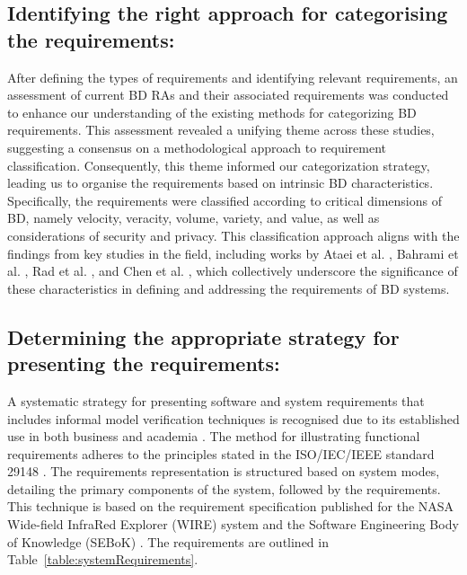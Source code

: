 \documentclass[preprint,12pt]{elsarticle}
\begin{document}
\subsection{Identifying the right approach for categorising the requirements:}

After defining the types of requirements and identifying relevant requirements, an assessment of current BD RAs and their associated requirements was conducted to enhance our understanding of the existing methods for categorizing BD requirements. This assessment revealed a unifying theme across these studies, suggesting a consensus on a methodological approach to requirement classification. Consequently, this theme informed our categorization strategy, leading us to organise the requirements based on intrinsic BD characteristics. Specifically, the requirements were classified according to critical dimensions of BD, namely velocity, veracity, volume, variety, and value, as well as considerations of security and privacy. This classification approach aligns with the findings from key studies in the field, including works by Ataei et al. \cite{ataei2022state}, Bahrami et al. \cite{Bahrami2015}, Rad et al. \cite{rad2017big}, and Chen et al. \cite{chang2015nist}, which collectively underscore the significance of these characteristics in defining and addressing the requirements of BD systems.

\subsection{Determining the appropriate strategy for presenting the requirements:} 

A systematic strategy for presenting software and system requirements that includes informal model verification techniques is recognised due to its established use in both business and academia \cite{kassab2014state}. The method for illustrating functional requirements adheres to the principles stated in the ISO/IEC/IEEE standard 29148 \cite{ISO29148}. The requirements representation is structured based on system modes, detailing the primary components of the system, followed by the requirements. This technique is based on the requirement specification published for the NASA Wide-field InfraRed Explorer (WIRE) system \cite{NASA} and the Software Engineering Body of Knowledge (SEBoK) \cite{abran2004software}. The requirements are outlined in Table~\ref{table:systemRequirements}.
\end{document}
